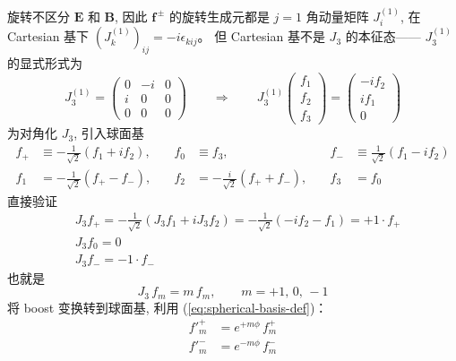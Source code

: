旋转不区分 $\boldsymbol{E}$ 和 $\boldsymbol{B}$,
因此 $\boldsymbol{f}^{\,\pm}$ 的旋转生成元都是 $j=1$ 角动量矩阵 $J_i^{(1)}$,
在 Cartesian 基下 $(J^{(1)}_k)_{ij}=-i\epsilon_{kij}$。
但 Cartesian 基不是 $J_3$ 的本征态——
$J^{(1)}_3$ 的显式形式为
\begin{equation}
    J^{(1)}_3 = \begin{pmatrix} 0&-i&0\\i&0&0\\0&0&0 \end{pmatrix}
    \qquad\Longrightarrow\qquad
    J^{(1)}_3 \begin{pmatrix} f_1\\f_2\\f_3 \end{pmatrix}
    = \begin{pmatrix} -if_2\\if_1\\0 \end{pmatrix}
\end{equation}
为对角化 $J_3$, 引入球面基
\begin{subequations}\label{eq:spherical-basis}
\begin{align}
    f_+ &\equiv -\tfrac{1}{\sqrt{2}}(f_1+if_2), &\quad
    f_0 &\equiv f_3, &\quad
    f_- &\equiv \tfrac{1}{\sqrt{2}}(f_1-if_2)
    \label{eq:spherical-basis-def}\\[4pt]
    f_1 &= -\tfrac{1}{\sqrt{2}}(f_+-f_-), &\quad
    f_2 &= -\tfrac{i}{\sqrt{2}}(f_++f_-), &\quad
    f_3 &= f_0
    \label{eq:spherical-basis-inv}
\end{align}
\end{subequations}
直接验证
\begin{subequations}
    \begin{align}
    &J_3 f_+ = -\frac{1}{\sqrt{2}}(J_3 f_1+iJ_3 f_2)= -\frac{1}{\sqrt{2}}(-if_2-f_1) = +1\cdot f_+\\
    &J_3 f_0=0\\
    &J_3 f_-=-1\cdot f_-
\end{align}
\end{subequations}
也就是
\begin{equation}
    J_3\,f_m = m\,f_m, \qquad m=+1,\,0,\,-1
    \label{eq:J3-diag}
\end{equation}
将 boost 变换转到球面基, 利用 (\ref{eq:spherical-basis-def})：
\begin{subequations}\label{eq:boost-spherical}
\begin{align}
    f'^+_m &= e^{+m\phi}\,f^+_m \label{eq:fplus-boost}\\
    f'^-_m &= e^{-m\phi}\,f^-_m \label{eq:fminus-boost}
\end{align}
\end{subequations}
